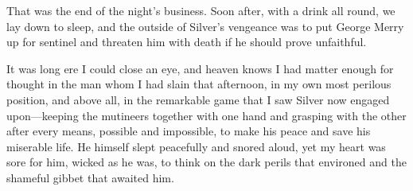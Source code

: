 That was the end of the night’s business. Soon after, with a drink all round, we lay down to sleep, and the outside of Silver’s vengeance was to put George Merry up for sentinel and threaten him with death if he should prove unfaithful.

It was long ere I could close an eye, and heaven knows I had matter enough for thought in the man whom I had slain that afternoon, in my own most perilous position, and above all, in the remarkable game that I saw Silver now engaged upon---keeping the mutineers together with one hand and grasping with the other after every means, possible and impossible, to make his peace and save his miserable life. He himself slept peacefully and snored aloud, yet my heart was sore for him, wicked as he was, to think on the dark perils that environed and the shameful gibbet that awaited him.